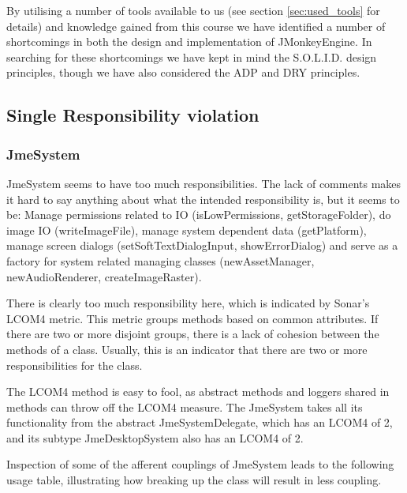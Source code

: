 \documentclass[a4paper, 10pt]{article}
\begin{document}
By utilising a number of tools available to us (see section
\ref{sec:used_tools} for details) and knowledge gained from this
course we have identified a number of shortcomings in both the design
and implementation of JMonkeyEngine. In searching for these
shortcomings we have kept in mind the  S.O.L.I.D. design principles,
though we have also considered the ADP and DRY principles.


\subsection{Single Responsibility violation}
\label{sec:srp_violation}
\subsubsection{JmeSystem}
JmeSystem seems to have too much responsibilities.
The lack of comments makes it hard to say anything about what 
the intended responsibility is, but it seems to be:
Manage permissions related to IO 
(isLowPermissions, getStorageFolder),
do image IO (writeImageFile),
manage system dependent data (getPlatform),
manage screen dialogs 
(setSoftTextDialogInput, showErrorDialog) and
serve as a factory for system related managing classes 
(newAssetManager, newAudioRenderer, createImageRaster).

There is clearly too much responsibility here, 
which is indicated by Sonar's LCOM4 metric.
This metric groups methods based on common attributes.
If there are two or more disjoint groups, 
there is a lack of cohesion between the methods of a class.
Usually, this is an indicator that there are two or more 
responsibilities for the class.

The LCOM4 method is easy to fool, as
abstract methods and loggers shared in methods can throw off
the LCOM4 measure.
The JmeSystem takes all its functionality 
from the abstract JmeSystemDelegate, 
which has an LCOM4 of 2,
and its subtype JmeDesktopSystem also has an LCOM4 of 2.

Inspection of some of the afferent couplings of JmeSystem 
leads to the following usage table, 
illustrating how breaking up the class will result in 
less coupling.
\end{document}
